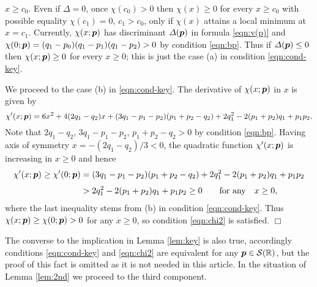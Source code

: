 \documentclass[a4paper,12pt]{article}
\theoremstyle{plain}
\def\R{\mathbb{R}}
\def\cS{\mathcal{S}}
\def\vD{\varDelta}
\def\bp{\mbox{\boldmath $p$}}
\begin{document}
$x \ge c_0$. 
Even if $\vD = 0$, once $\chi(c_0) > 0$ then $\chi(x) \ge 0$ for every  
$x \ge c_0$ with possible equality $\chi(c_1) = 0$, $c_1 > c_0$,  
only if $\chi(x)$ attains a local minimum at $x = c_1$. 
Currently, $\chi(x; \bp)$ has discriminant $\vD(\bp)$ in formula 
\eqref{eqn:v(p)} and $\chi(0; \bp) = (q_1-p_0)(q_1-p_1)(q_1-p_2) > 0$ by 
condition \eqref{eqn:bp}.   
Thus if $\vD(\bp) \le 0$ then $\chi(x; \bp) \ge 0$ for every $x \ge 0$; 
this is just the case (a) in condition \eqref{eqn:cond-key}.  
\par
We proceed to the case (b) in \eqref{eqn:cond-key}. 
The derivative of $\chi(x; \bp)$ in $x$ is given by 
\[
\chi'(x; \bp) = 6 x^2 +4 (2 q_1-q_2) x
+ (3 q_1-p_1-p_2)(p_1+p_2-q_2)  + 2 q_1^2 -2 (p_1+p_2) q_1 + p_1 p_2.  
\]
Note that $2 q_1 - q_2$, $3 q_1-p_1-p_2$, $p_1+p_2-q_2 > 0$ 
by condition \eqref{eqn:bp}. 
Having axis of symmetry $x = -(2 q_1-q_2)/3 < 0$, the 
quadratic function $\chi'(x; \bp)$ is increasing in $x \ge 0$ and hence    
\begin{align*}
\chi'(x; \bp) \ge \chi'(0; \bp) 
&= (3 q_1-p_1-p_2)(p_1+p_2-q_2)  + 2 q_1^2 -2 (p_1+p_2) q_1 + p_1 p_2 \\[1mm]
&> 2 q_1^2 -2 (p_1+p_2) q_1 + p_1 p_2 \ge 0 
\qquad \mbox{for any} \quad x \ge 0,  
\end{align*}
where the last inequality stems from (b) in condition \eqref{eqn:cond-key}.  
Thus $\chi(x; \bp) \ge \chi(0; \bp) > 0$ for any $x \ge 0$, so condition 
\eqref{eqn:chi2} is satisfied. \hfill $\Box$ \par\medskip
The converse to the implication in Lemma \ref{lem:key} is also true, 
accordingly conditions \eqref{eqn:cond-key} and \eqref{eqn:chi2} are 
equivalent for any $\bp \in \cS(\R)$, but the proof of this fact is omitted 
as it is not needed in this article.  
In the situation of Lemma \ref{lem:2nd} we proceed to the third component. 
\end{document}
